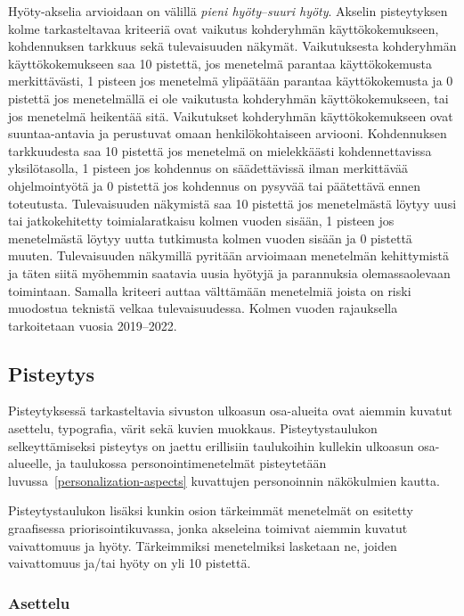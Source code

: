 \documentclass[finnish, 12pt, a4paper, elec, utf8, a-1b, online]{aaltothesis}
\begin{document}
Hyöty-akselia arvioidaan on välillä \textit{pieni hyöty}--\textit{suuri hyöty}.
Akselin pisteytyksen kolme tarkasteltavaa kriteeriä ovat vaikutus kohderyhmän
käyttökokemukseen, kohdennuksen tarkkuus sekä tulevaisuuden näkymät.
Vaikutuksesta kohderyhmän käyttökokemukseen saa 10 pistettä, jos menetelmä
parantaa käyttökokemusta merkittävästi, 1 pisteen jos menetelmä ylipäätään
parantaa käyttökokemusta ja 0 pistettä jos menetelmällä ei ole vaikutusta
kohderyhmän käyttökokemukseen, tai jos menetelmä heikentää sitä. Vaikutukset
kohderyhmän käyttökokemukseen ovat suuntaa-antavia ja perustuvat omaan
henkilökohtaiseen arviooni. Kohdennuksen tarkkuudesta saa 10 pistettä jos
menetelmä on mielekkäästi kohdennettavissa yksilötasolla, 1 pisteen jos
kohdennus on säädettävissä ilman merkittävää ohjelmointyötä ja 0 pistettä jos
kohdennus on pysyvää tai päätettävä ennen toteutusta. Tulevaisuuden näkymistä
saa 10 pistettä jos menetelmästä löytyy uusi tai jatkokehitetty toimialaratkaisu
kolmen vuoden sisään, 1 pisteen jos menetelmästä löytyy uutta tutkimusta kolmen
vuoden sisään ja 0 pistettä muuten. Tulevaisuuden näkymillä pyritään arvioimaan
menetelmän kehittymistä ja täten siitä myöhemmin saatavia uusia hyötyjä ja
parannuksia olemassaolevaan toimintaan. Samalla kriteeri auttaa välttämään
menetelmiä joista on riski muodostua teknistä velkaa tulevaisuudessa. Kolmen
vuoden rajauksella tarkoitetaan vuosia 2019--2022.

\subsection{Pisteytys}

Pisteytyksessä tarkasteltavia sivuston ulkoasun osa-alueita ovat aiemmin
kuvatut asettelu, typografia, värit sekä kuvien muokkaus.
Pisteytystaulukon selkeyttämiseksi pisteytys on jaettu erillisiin taulukoihin
kullekin ulkoasun osa-alueelle, ja taulukossa personointimenetelmät pisteytetään
luvussa~\ref{personalization-aspects} kuvattujen personoinnin näkökulmien
kautta.

Pisteytystaulukon lisäksi kunkin osion tärkeimmät menetelmät on esitetty
graafisessa priorisointikuvassa, jonka akseleina toimivat aiemmin kuvatut
vaivattomuus ja hyöty. Tärkeimmiksi menetelmiksi lasketaan ne, joiden
vaivattomuus ja/tai hyöty on yli 10 pistettä.

\subsubsection{Asettelu}
\end{document}

